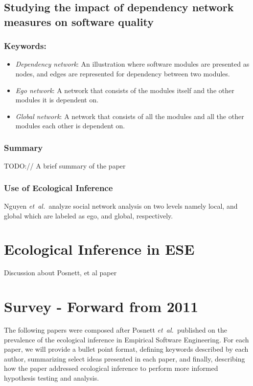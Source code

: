 \documentclass{sig-alternate-05-2015}
\newcommand{\etal}{\mbox{\emph{et al.\ }}}
\begin{document}
\subsection{Studying the impact of dependency network measures on software quality \cite{Nguyen:2010}}

\subsubsection{Keywords:}
\begin{itemize}
\item \emph{Dependency network}:  An illustration where software modules are presented as nodes, and edges are represented for dependency between two modules.
\item \emph{Ego network}:  A network that consists of the modules itself and the other modules it is dependent on.
\item \emph{Global network}: A network that consists of all the modules and all the other modules each other is dependent on.
\end{itemize} 

\subsubsection{Summary}
TODO:// A brief summary of the paper

\subsubsection{Use of Ecological Inference}
Nguyen \etal analyze social network analysis on two levels namely local, and global which are labeled as ego, and global, respectively.


\section{Ecological Inference in ESE}
Discussion about Posnett, et al paper


\section{Survey - Forward from 2011}
The following papers were composed after Posnett \etal \newline published on the prevalence of the ecological inference in Empirical Software Engineering.  For each paper, we will provide a bullet point format, defining keywords described by each author, summarizing select ideas presented in each paper, and finally, describing how the paper addressed ecological inference to perform more informed hypothesis testing and analysis.
\end{document}
